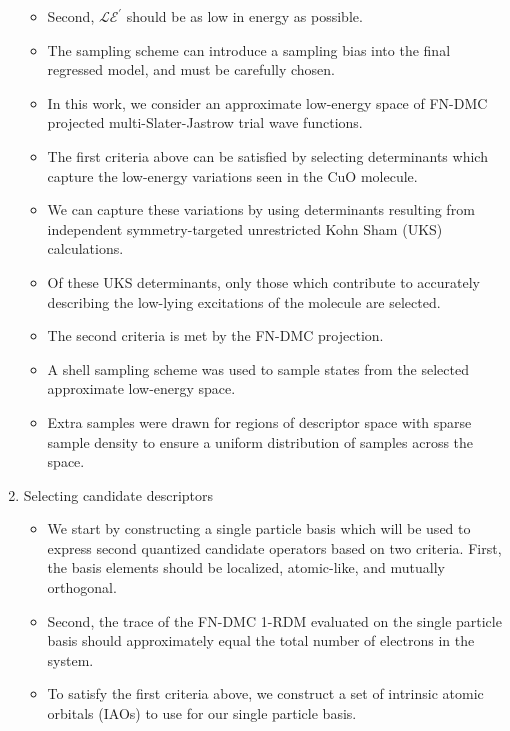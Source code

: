 \documentclass{article}
\begin{document}
\begin{enumerate}
\begin{itemize}
\item Second, $\mathcal{LE}^\prime$ should be as low in energy as possible.

\item The sampling scheme can introduce a sampling bias into the final regressed model, and must be carefully chosen.

\item In this work, we consider an approximate low-energy space of FN-DMC projected multi-Slater-Jastrow trial wave functions.

\item The first criteria above can be satisfied by selecting determinants which capture the low-energy variations seen in the CuO molecule.

\item We can capture these variations by using determinants resulting from independent symmetry-targeted unrestricted Kohn Sham (UKS) calculations.

\item Of these UKS determinants, only those which contribute to accurately describing the low-lying excitations of the molecule are selected.

\item The second criteria is met by the FN-DMC projection.

\item A shell sampling scheme was used to sample states from the selected approximate low-energy space.

\item Extra samples were drawn for regions of descriptor space with sparse sample density to ensure a uniform distribution of samples across the space.
\end{itemize}

\item Selecting candidate descriptors 
\begin{itemize}
\item We start by constructing a single particle basis which will be used to express second quantized candidate operators based on two criteria.
First, the basis elements should be localized, atomic-like, and mutually orthogonal.

\item Second, the trace of the FN-DMC 1-RDM evaluated on the single particle basis should approximately equal the total number of electrons in the system.

\item To satisfy the first criteria above, we construct a set of intrinsic atomic orbitals (IAOs) to use for our single particle basis.


\end{itemize}
\end{enumerate}
\end{document}
